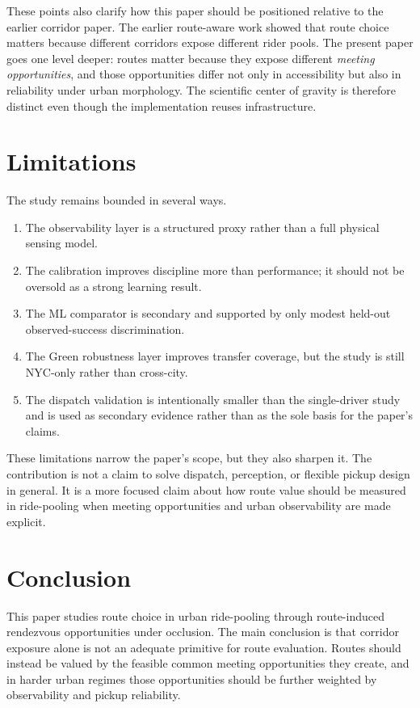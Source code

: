 \documentclass[journal]{IEEEtran}
\begin{document}
These points also clarify how this paper should be positioned relative to the earlier corridor paper. The earlier route-aware work showed that route choice matters because different corridors expose different rider pools. The present paper goes one level deeper: routes matter because they expose different \emph{meeting opportunities}, and those opportunities differ not only in accessibility but also in reliability under urban morphology. The scientific center of gravity is therefore distinct even though the implementation reuses infrastructure.

\section{Limitations}
The study remains bounded in several ways.
\begin{enumerate}
\item The observability layer is a structured proxy rather than a full physical sensing model.
\item The calibration improves discipline more than performance; it should not be oversold as a strong learning result.
\item The ML comparator is secondary and supported by only modest held-out observed-success discrimination.
\item The Green robustness layer improves transfer coverage, but the study is still NYC-only rather than cross-city.
\item The dispatch validation is intentionally smaller than the single-driver study and is used as secondary evidence rather than as the sole basis for the paper's claims.
\end{enumerate}

These limitations narrow the paper's scope, but they also sharpen it. The contribution is not a claim to solve dispatch, perception, or flexible pickup design in general. It is a more focused claim about how route value should be measured in ride-pooling when meeting opportunities and urban observability are made explicit.

\section{Conclusion}
This paper studies route choice in urban ride-pooling through route-induced rendezvous opportunities under occlusion. The main conclusion is that corridor exposure alone is not an adequate primitive for route evaluation. Routes should instead be valued by the feasible common meeting opportunities they create, and in harder urban regimes those opportunities should be further weighted by observability and pickup reliability.
\end{document}
